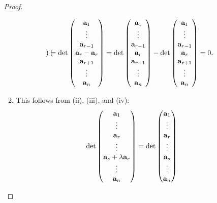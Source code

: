 \documentclass[10pt, a4paper]{article}
\begin{document}
\begin{enumerate}[label = (\roman*)]
\begin{proof}
\begin{enumerate}[label = (\roman*)]
\[\begin{pmatrix}
            \end{pmatrix}
            =
            \det\begin{pmatrix}
                \mathbf{a}_1 \\ \vdots \\ \mathbf{a}_{r - 1} \\ \mathbf{a}_r - \mathbf{a}_r \\ \mathbf{a}_{r + 1} \\ \vdots \\ \mathbf{a}_n
            \end{pmatrix}
            =
            \det\begin{pmatrix}
                \mathbf{a}_1 \\ \vdots \\ \mathbf{a}_{r - 1} \\ \mathbf{a}_r \\ \mathbf{a}_{r + 1} \\ \vdots \\ \mathbf{a}_n
            \end{pmatrix}
            -
            \det\begin{pmatrix}
                \mathbf{a}_1 \\ \vdots \\ \mathbf{a}_{r - 1} \\ \mathbf{a}_r \\ \mathbf{a}_{r + 1} \\ \vdots \\ \mathbf{a}_n
            \end{pmatrix}
            = 0.
            \]
            \item This follows from (ii), (iii), and (iv):
            \[
            \det\begin{pmatrix}
                \mathbf{a}_1 \\ \vdots \\ \mathbf{a}_r \\ \vdots \\ \mathbf{a}_s + \lambda \mathbf{a}_r \\ \vdots \\ \mathbf{a}_n
            \end{pmatrix}
            =
            \det\begin{pmatrix}
                \mathbf{a}_1 \\ \vdots \\ \mathbf{a}_r \\ \vdots \\ \mathbf{a}_s \\ \vdots \\ \mathbf{a}_n

\end{pmatrix}\]
\end{enumerate}
\end{proof}
\end{enumerate}
\end{document}
